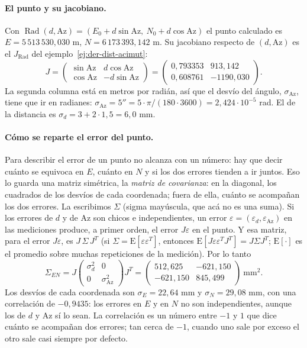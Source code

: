 \paragraph{El punto y su jacobiano.} Con \(\operatorname{Rad}(d,\mathrm{Az})=(E_0+d\sin\mathrm{Az},\
N_0+d\cos\mathrm{Az})\) el punto calculado es \(E=5\,513\,530{,}030\) m,
\(N=6\,173\,393{,}142\) m. Su jacobiano respecto de \((d,\mathrm{Az})\) es el \(J_{\operatorname{Rad}}\) del
ejemplo~\ref{ej:der-dist-acimut}:
\[
  J=\begin{pmatrix}\sin\mathrm{Az}&d\cos\mathrm{Az}\\ \cos\mathrm{Az}&-d\sin\mathrm{Az}\end{pmatrix}
  =\begin{pmatrix}0{,}793353&913{,}142\\0{,}608761&-1190{,}030\end{pmatrix}.
\]
La segunda columna está en metros por radián, así que el desvío del ángulo, \(\sigma_{\mathrm{Az}}\),
tiene que ir en
radianes: \(\sigma_{\mathrm{Az}}=5''=5\cdot\pi/(180\cdot3600)=2{,}424\cdot10^{-5}\) rad. El de la
distancia es \(\sigma_d=3+2\cdot1{,}5=6{,}0\) mm.

\paragraph{Cómo se reparte el error del punto.} Para describir el error de un punto no alcanza
con un número: hay que decir cuánto se equivoca en \(E\), cuánto en \(N\) y si los dos errores
tienden a ir juntos. Eso lo guarda una matriz simétrica, la \emph{matriz de covarianza}: en la
diagonal, los cuadrados de los desvíos de cada coordenada; fuera de ella, cuánto se acompañan
los dos errores. La escribimos \(\Sigma\) (sigma mayúscula, que acá no es una suma). Si los
errores de \(d\) y de \(\mathrm{Az}\) son chicos e
independientes, un error \(\varepsilon=(\varepsilon_d,\varepsilon_{\mathrm{Az}})\) en las
mediciones produce, a primer orden, el error \(J\varepsilon\) en el punto. Y esa matriz, para el error
\(J\varepsilon\), es \(J\,\Sigma\,J^T\) (si \(\Sigma=\mathrm{E}[\varepsilon\varepsilon^T]\),
entonces \(\mathrm{E}[J\varepsilon\varepsilon^TJ^T]=J\Sigma J^T\); \(\mathrm{E}[\cdot]\) es el
promedio sobre muchas repeticiones de la medición). Por lo tanto
\[
  \Sigma_{EN}=J\begin{pmatrix}\sigma_d^2&0\\0&\sigma_{\mathrm{Az}}^2\end{pmatrix}J^T
  =\begin{pmatrix}512{,}625&-621{,}150\\-621{,}150&845{,}499\end{pmatrix}\ \text{mm}^2 .
\]
Los desvíos de cada coordenada son \(\sigma_E=22{,}64\) mm y \(\sigma_N=29{,}08\) mm, con una
correlación de \(-0{,}9435\): los errores en \(E\) y en \(N\) no son independientes, aunque los
de \(d\) y \(\mathrm{Az}\) sí lo sean. La correlación es un número entre \(-1\) y \(1\) que dice
cuánto se acompañan dos errores; tan cerca de \(-1\), cuando uno sale por exceso el otro sale
casi siempre por defecto.

